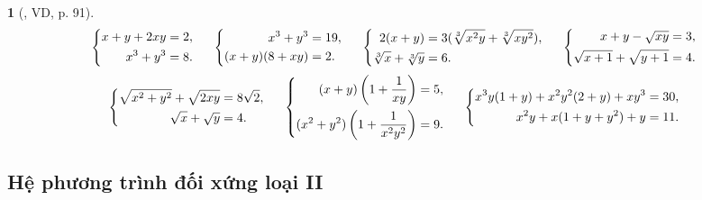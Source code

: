 \documentclass{article}
\newtheorem{baitoan}{}
\begin{document}
\begin{baitoan}[\cite{Kien_dai_so_9}, VD, p. 91]
	\begin{equation*}
		\left\{\begin{split}
			x + y + 2xy &= 2,\\
			x^3 + y^3 &= 8.
		\end{split}\right.\hspace{5mm}\left\{\begin{split}
			x^3 + y^3 &= 19,\\
			(x + y)(8 + xy) &= 2.
		\end{split}\right.\hspace{5mm}\left\{\begin{split}
			2(x + y) &= 3(\sqrt[3]{x^2y} + \sqrt[3]{xy^2}),\\
			\sqrt[3]{x} + \sqrt[3]{y} &= 6.
		\end{split}\right.\hspace{5mm}\left\{\begin{split}
			x + y - \sqrt{xy} &= 3,\\
			\sqrt{x + 1} + \sqrt{y + 1} &= 4.
		\end{split}\right.
	\end{equation*}
	\begin{equation*}
		\left\{\begin{split}
			\sqrt{x^2 + y^2} + \sqrt{2xy} &= 8\sqrt{2},\\
			\sqrt{x} + \sqrt{y} &= 4.
		\end{split}\right.\hspace{5mm}\left\{\begin{split}
			(x + y)\left(1 + \frac{1}{xy}\right) &= 5,\\
			(x^2 + y^2)\left(1 + \frac{1}{x^2y^2}\right) &= 9.
		\end{split}\right.\hspace{5mm}\left\{\begin{split}
			x^3y(1 + y) + x^2y^2(2 + y) + xy^3 &= 30,\\
			x^2y + x(1 + y + y^2) + y &= 11.
		\end{split}\right.
	\end{equation*}	
\end{baitoan}

\subsection{Hệ phương trình đối xứng loại II}
\end{document}
